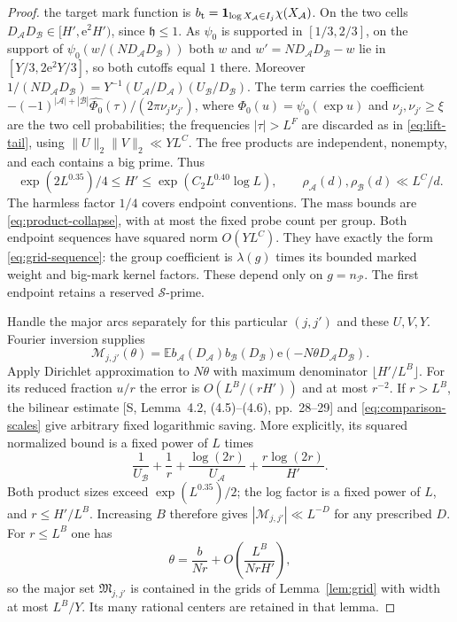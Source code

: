 \documentclass[11pt]{article}
\theoremstyle{definition}
\newcommand{\e}{\mathrm e}
\newcommand{\E}{\mathbb E}
\newcommand{\ind}{\mathbf 1}
\newcommand{\Pset}{\mathcal P}
\newcommand{\Sset}{\mathcal S}
\theoremstyle{remark}
\begin{document}
\begin{proof}
the target mark function is
$b_{\rm t}=\ind_{\log X_{\mathcal A}\in I_j}\chi(X_{\mathcal A})$.
On the two cells $D_{\mathcal A}D_{\mathcal B}\in[H',\mathrm e^2H')$, since
$\mathfrak h\le1$. As $\psi_0$ is supported in $[1/3,2/3]$, on the support of
$\psi_0(w/(ND_{\mathcal A}D_{\mathcal B}))$ both $w$ and
$w'=ND_{\mathcal A}D_{\mathcal B}-w$ lie in $[Y/3,2\mathrm e^2Y/3]$, so both
cutoffs equal $1$ there. Moreover
$1/(ND_{\mathcal A}D_{\mathcal B})
 =Y^{-1}(U_{\mathcal A}/D_{\mathcal A})(U_{\mathcal B}/D_{\mathcal B})$.
The term carries the coefficient
$-(-1)^{|\mathcal A|+|\mathcal B|}\widehat{\Phi_0}(\tau)/(2\pi\nu_j\nu_{j'})$,
where $\Phi_0(u)=\psi_0(\exp u)$ and $\nu_j,\nu_{j'}\ge\xi$ are the two
cell probabilities; the frequencies $|\tau|>L^F$ are discarded as in
\eqref{eq:lift-tail}, using $\|U\|_2\|V\|_2\ll YL^C$.
The free products are independent, nonempty, and each contains a big
prime. Thus
\begin{equation}\label{eq:comparison-scales}
\exp(2L^{0.35})/4\le H'\le
             \exp(C_2L^{0.40}\log L),\qquad
\rho_{\mathcal A}(d),\rho_{\mathcal B}(d)\ll L^C/d.
\end{equation}
The harmless factor $1/4$ covers endpoint conventions.
The mass bounds are \eqref{eq:product-collapse}, with at most the
fixed probe count per group.
Both endpoint sequences have squared norm $O(YL^C)$.
They have exactly the form \eqref{eq:grid-sequence}: the group
coefficient is $\lambda(g)$ times its bounded marked weight and
big-mark kernel factors. These depend only on $g=n_{\Pset}$.
The first endpoint retains a reserved $\Sset$-prime.

Handle the major arcs separately for this particular $(j,j')$ and
these $U,V,Y$. Fourier inversion supplies
\begin{equation}\label{eq:comparison-multiplier}
\mathcal M_{j,j'}(\theta)=
\E b_{\mathcal A}(D_{\mathcal A})b_{\mathcal B}(D_{\mathcal B})
       \e(-N\theta D_{\mathcal A}D_{\mathcal B}).
\end{equation}
Apply Dirichlet approximation to $N\theta$ with maximum denominator
$\lfloor H'/L^B\rfloor$.
For its reduced fraction $u/r$ the error is
$O(L^B/(rH'))$ and at most $r^{-2}$.
If $r>L^B$, the bilinear estimate [S, Lemma~4.2, (4.5)--(4.6),
pp.~28--29] and \eqref{eq:comparison-scales} give arbitrary fixed
logarithmic saving. More explicitly, its squared normalized bound
is a fixed power of $L$ times
\[
\frac1{U_{\mathcal B}}+\frac1r
+\frac{\log(2r)}{U_{\mathcal A}}
+\frac{r\log(2r)}{H'}.
\]
Both product sizes exceed $\exp(L^{0.35})/2$; the log factor is a
fixed power of $L$, and $r\le H'/L^B$. Increasing $B$ therefore gives
$|\mathcal M_{j,j'}|\ll L^{-D}$ for any prescribed $D$.
For $r\le L^B$ one has
\begin{equation}\label{eq:comparison-arcs}
\theta=\frac b{Nr}
 +O\left(\frac{L^B}{NrH'}\right),
\end{equation}
so the major set $\mathfrak M_{j,j'}$ is contained in the grids of
Lemma~\ref{lem:grid} with width at most $L^B/Y$.
Its many rational centers are retained in that lemma.


\end{proof}
\end{document}
